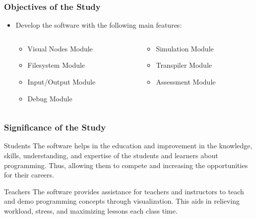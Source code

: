 \documentclass{beamer}
\newcommand{\parx}{
	\setlength{\parindent}{4em}
	\par}
\begin{document}
\begin{frame}
	\frametitle{Objectives of the Study}
	\justifying
	\parx
	\begin{itemize}
		\item<1-> Develop the software with the following main features:
		\begin{columns}
			\begin{column}{.5\linewidth}
				\begin{itemize}
						\item<2-> Visual Nodes Module
						\item<3-> Filesystem Module
						\item<4-> Input/Output Module
						\item<5-> Debug Module
				\end{itemize}
			\end{column}
			\begin{column}{.5\linewidth}
				\begin{itemize}
						\item<9-> Simulation Module
						\item<7-> Transpiler Module
						\item<8-> Assessment Module
				\end{itemize}
			\end{column}
		\end{columns}
	\end{itemize}
\end{frame}

\begin{frame}
	\frametitle{Significance of the Study}
	\begin{block}{Students}
		The software helps in the education and improvement in the knowledge,
		skills, understanding, and expertise of the students and learners about
		programming. Thus, allowing them to compete and increasing the
		opportunities for their careers.
	\end{block}

	\begin{block}{Teachers}
		The software provides assistance for teachers and instructors to teach and
		demo programming concepts through visualization. This aids in relieving workload,
		stress, and maximizing lessons each class time.
	\end{block}
\end{frame}
\end{document}
